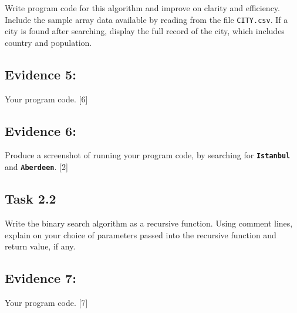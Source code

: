 Write program code for this algorithm and improve on clarity and efficiency.
Include the sample array data available by reading from the file \texttt{CITY.csv}.
If a city is found after searching, display the full record of the
city, which includes country and population. 

\subsection*{Evidence 5: }

Your program code. \hfill{} {[}6{]}

\subsection*{Evidence 6: }

Produce a screenshot of running your program code, by searching for
\texttt{\textbf{Istanbul}} and \texttt{\textbf{Aberdeen}}. \hfill{}
{[}2{]}

\subsection*{Task 2.2 }

Write the binary search algorithm as a recursive function. Using comment
lines, explain on your choice of parameters passed into the recursive
function and return value, if any. 

\subsection*{Evidence 7: }

Your program code. \hfill{} {[}7{]}